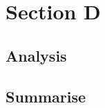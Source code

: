 \section*{Section D}
\label{sec:Section D}
\FloatBarrier %


\subsection*{Analysis}


\subsection*{Summarise}